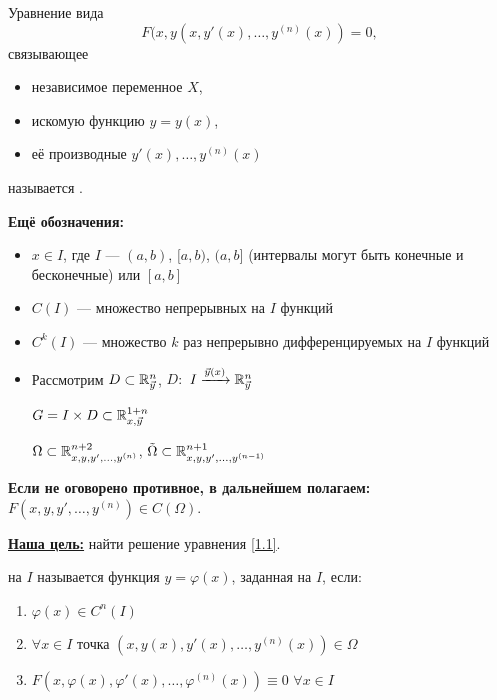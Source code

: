 \vspace{5mm}

\begin{Def}
Уравнение вида
\begin{equation}\label{1.1}
    F(x, y(x, y'(x), \ldots, y^{(n)}(x)) = 0,
\end{equation} связывающее
\begin{itemize}
    \item независимое переменное $X$,
    \item искомую функцию $y = y(x)$,
    \item её производные $y'(x), \ldots, y^{(n)}(x)$
\end{itemize}
называется .
\end{Def}
\vspace{3mm}

\textbf{Ещё обозначения:}
\begin{itemize}
    \item $x \in I$, где $I$ --- $(a,b)$, $[a,b)$, $(a, b]$ (интервалы могут быть конечные и бесконечные) или $[a,b]$
    \item $C(I)$ --- множество непрерывных на $I$ функций
    \item $C^k(I)$ --- множество $k$ раз непрерывно дифференцируемых на $I$ функций


\item Рассмотрим
$D \subset \mathbb{R}^n_{\vec{y}}$, $D:$ $ I \xrightarrow{\vec{y}(x)} \mathbb{R}^n_{\vec{y}}$

$G = I \times D \subset \mathbb{R}^{1 + n}_{x, \vec{y}}$

$\Omega \subset \mathbb{R}^{n + 2}_{x, y, y', \ldots, y^{(n)}}$, $\Tilde{\Omega} \subset \mathbb{R}^{n + 1}_{x, y, y', \ldots, y^{(n - 1)}}$
\end{itemize}

\textbf{Если не оговорено противное, в дальнейшем полагаем:}
$F(x, y, y', \ldots,y^{(n)}) \in C(\Omega)$.

\vspace{5mm}

\textbf{\underline{Наша цель:}} найти решение уравнения \ref{1.1}.

\begin{Def}
 на $I$ называется функция $y = \varphi (x)$, заданная на $I$, если:
\begin{enumerate}
    \item $\varphi (x) \in C^n (I)$
    \item $\forall x \in I$ точка $(x, y(x), y'(x), \ldots,y^{(n)}(x) ) \in \Omega$
    \item $F(x, \varphi(x), \varphi'(x), \ldots, \varphi^{(n)}(x)) \equiv 0$ $\forall x \in I$
\end{enumerate}
\end{Def}

